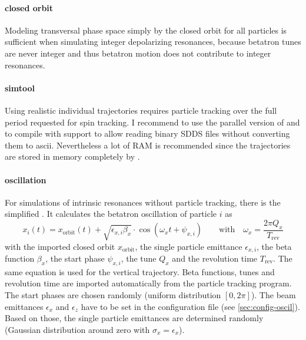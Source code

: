 \documentclass[a4paper]{scrartcl}
\begin{document}
\paragraph{closed orbit}
Modeling transversal phase space simply by the closed orbit for all particles is
sufficient when simulating integer depolarizing resonances, because betatron tunes are
never integer and thus betatron motion does not contribute to integer resonances.

\paragraph{simtool}
Using realistic individual trajectories requires particle tracking over the full period
requested for spin tracking. I recommend to use the parallel version of \ele and to
compile \pal with  support to allow \pal reading binary SDDS files without
converting them to ascii. Nevertheless a lot of RAM is recommended since the trajectories
are stored in memory completely by .

\paragraph{oscillation}
For simulations of intrinsic resonances without particle tracking, there is the simplified
 . It calculates the betatron
oscillation of particle $i$ as
\begin{equation}
  \label{eq:traj-oscillation}
  x_i(t) = x_\text{orbit}(t) + \sqrt{\epsilon_{x,i} \beta_x} \cdot \cos\left(\omega_xt + \psi_{x,i}\right)
  \qquad\text{with}\quad
  \omega_x = \frac{2\pi Q_x}{T_\text{rev}}
\end{equation}
with the imported closed orbit $x_\text{orbit}$, the single particle emittance
$\epsilon_{x,i}$, the beta function $\beta_x$, the start phase $\psi_{x,i}$, the tune
$Q_x$ and the revolution time $T_\text{rev}$. The same equation is used for the vertical
trajectory.
%
Beta functions, tunes and revolution time are imported automatically from the particle tracking
program. The start phases are chosen randomly (uniform distribution $[0,2\pi]$). The
beam emittances $\epsilon_x$ and $\epsilon_z$ have to be set in the configuration file
(see \cref{sec:config-oscil}).
Based on those, the single particle emittances are determined randomly (Gaussian
distribution around zero with $\sigma_x=\epsilon_x$).
\end{document}
